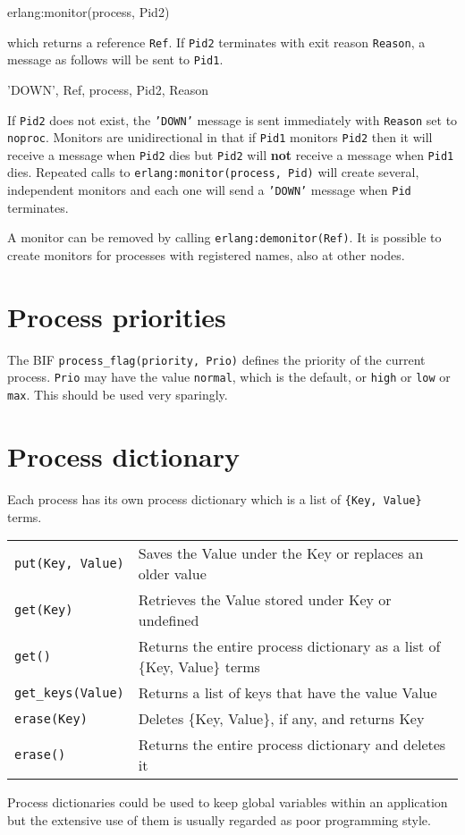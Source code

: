 \begin{erlang}
erlang:monitor(process, Pid2)
\end{erlang}

which returns a reference \texttt{Ref}. If \texttt{Pid2} terminates
with exit reason \texttt{Reason}, a message as follows will be sent to
\texttt{Pid1}.

\begin{erlang}
{'DOWN', Ref, process, Pid2, Reason}
\end{erlang}

If \texttt{Pid2} does not exist, the \texttt{'DOWN'} message is sent
immediately with \texttt{Reason} set to \texttt{noproc}. Monitors are
unidirectional in that if \texttt{Pid1} monitors \texttt{Pid2} then it
will receive a message when \texttt{Pid2} dies but \texttt{Pid2} will
\textbf{not} receive a message when \texttt{Pid1} dies. Repeated calls
to \texttt{erlang:monitor(process, Pid)} will create several,
independent monitors and each one will send a \texttt{'DOWN'} message
when \texttt{Pid} terminates.

A monitor can be removed by calling \texttt{erlang:demonitor(Ref)}. It
is possible to create monitors for processes with registered names,
also at other nodes.


\section{Process priorities}
The BIF \texttt{process\_flag(priority, Prio)} defines the priority of
the current process. \texttt{Prio} may have the value \texttt{normal},
which is the default, or \texttt{high} or \texttt{low} or \texttt{max}. This should be
used very sparingly.


\section{Process dictionary}
\label{processes:dicts}
Each process has its own process dictionary which is a list of
\texttt{\{Key, Value\}} terms.

\begin{center}
\begin{tabular}{|>{\raggedright}p{79pt}|>{\raggedright}p{247pt}|}
\hline
\multicolumn{2}{|p{326pt}|}{Process dictionary BIFs}\tabularnewline
\hline
\texttt{put(Key, Value)} & Saves the Value under the Key or replaces an older value\tabularnewline
\hline
\texttt{get(Key)} & Retrieves the Value stored under Key or undefined\tabularnewline
\hline
\texttt{get()} & Returns the entire process dictionary as a list of \{Key, Value\} terms\tabularnewline
\hline
\texttt{get\_keys(Value)} & Returns a list of keys that have the value Value\tabularnewline
\hline
\texttt{erase(Key)} & Deletes \{Key, Value\}, if any, and returns Key\tabularnewline
\hline
\texttt{erase()} & Returns the entire process dictionary and deletes it\tabularnewline
\hline
\end{tabular}
\end{center}

Process dictionaries could be used to keep global variables within an application but the extensive use of them is usually regarded as poor programming style.
